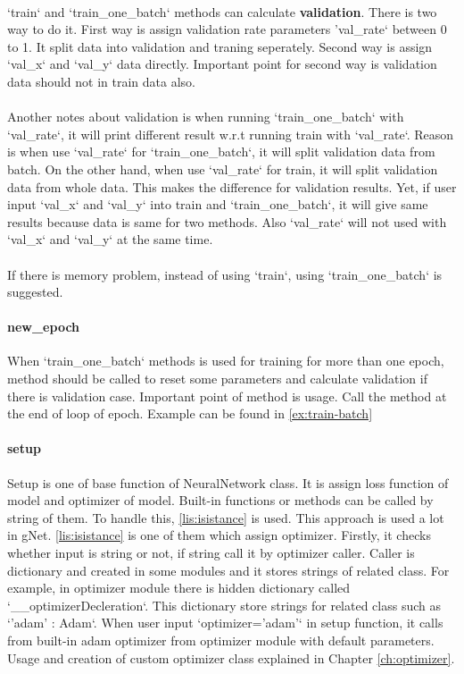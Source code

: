\documentclass[12pt]{report}
\begin{document}
\paragraph{}
\label{pr:validation}
`train` and `train\_one\_batch` methods can calculate \textbf{validation}. There is two way to do it. First way is assign validation rate parameters 'val\_rate` between 0 to 1. It split data into validation and traning seperately. Second way is assign `val\_x` and `val\_y` data directly. Important point for second way is validation data should not in train data also. 

\paragraph{}
Another notes about validation is when running `train\_one\_batch` with `val\_rate`, it will print different result w.r.t running train with `val\_rate`. Reason is when use `val\_rate` for `train\_one\_batch`, it will split validation data from batch. On the other hand, when use `val\_rate` for train, it will split validation data from whole data. This makes the difference for validation results. Yet, if user input `val\_x` and `val\_y` into train and `train\_one\_batch`, it will give same results because data is same for two methods. Also `val\_rate` will not used with `val\_x` and `val\_y` at the same time.

\paragraph{}
If there is memory problem, instead of using `train`, using `train\_one\_batch` is suggested.

\paragraph{new\_epoch}
When `train\_one\_batch` methods is used for training for more than one epoch, method should be called to reset some parameters and calculate validation if there is validation case. Important point of method is usage. Call the method at the end of loop of epoch. Example can be found in \ref{ex:train-batch}


\paragraph{setup}
Setup is one of base function of NeuralNetwork class. It is assign loss function of model and optimizer of model. Built-in functions or methods can be called by string of them. To handle this, \ref{lis:isistance} is used. This approach is used a lot in gNet. \ref{lis:isistance} is one of them which assign optimizer. Firstly, it checks whether input is string or not, if string call it by optimizer caller. Caller is dictionary and created in some modules and it stores strings of related class. For example, in optimizer module there is hidden dictionary called `\_\_optimizerDecleration`. This dictionary store strings for related class such as `'adam' : Adam`. When user input `optimizer='adam'` in setup function, it calls from built-in adam optimizer from optimizer module with default parameters. Usage and creation of custom optimizer class explained in Chapter \ref{ch:optimizer}.
\end{document}
